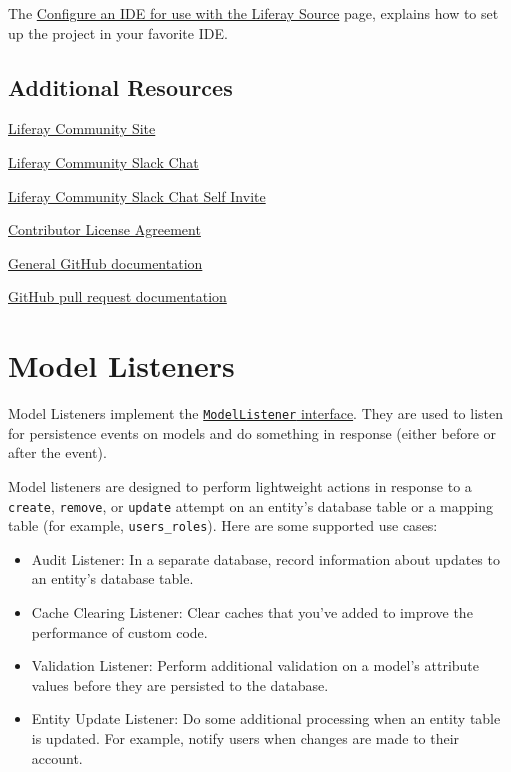 The
\href{https://portal.liferay.dev/participate/fix-a-bug/ide-support}{Configure
an IDE for use with the Liferay Source} page, explains how to set up the
project in your favorite IDE.

\section{Additional Resources}\label{additional-resources}

\href{https://liferay.dev}{Liferay Community Site}

\href{https://liferay-community.slack.com/}{Liferay Community Slack
Chat}

\href{https://liferay.dev/chat}{Liferay Community Slack Chat Self
Invite}

\href{https://www.liferay.com/legal/contributors-agreement}{Contributor
License Agreement}

\href{http://help.github.com/}{General GitHub documentation}

\href{http://help.github.com/send-pull-requests/}{GitHub pull request
documentation}

\chapter{Model Listeners}\label{model-listeners}

Model Listeners implement the
\href{https://docs.liferay.com/dxp/portal/7.2-latest/javadocs/portal-kernel/com/liferay/portal/kernel/model/ModelListener.html}{\texttt{ModelListener}
interface}. They are used to listen for persistence events on models and
do something in response (either before or after the event).

Model listeners are designed to perform lightweight actions in response
to a \texttt{create}, \texttt{remove}, or \texttt{update} attempt on an
entity's database table or a mapping table (for example,
\texttt{users\_roles}). Here are some supported use cases:

\begin{itemize}
\tightlist
\item
  Audit Listener: In a separate database, record information about
  updates to an entity's database table.
\item
  Cache Clearing Listener: Clear caches that you've added to improve the
  performance of custom code.
\item
  Validation Listener: Perform additional validation on a model's
  attribute values before they are persisted to the database.
\item
  Entity Update Listener: Do some additional processing when an entity
  table is updated. For example, notify users when changes are made to
  their account.
\end{itemize}

